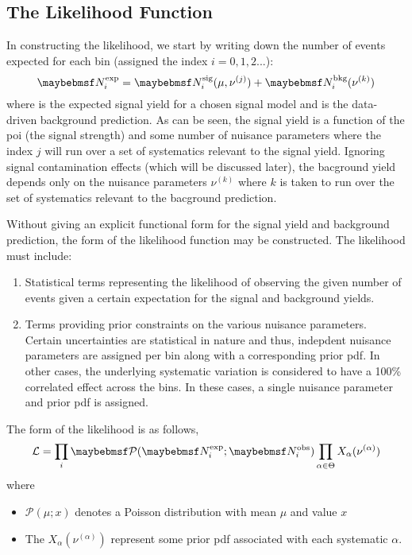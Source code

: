 \subsection{The Likelihood Function}
In constructing the likelihood, we start by writing down the number of events
expected for each bin (assigned the index $i=0,1,2...$):
\begin{equation}
\NExpi = \NSigi(\mu, \nu^{(j)}) +
\NBkgi(\nu^{(k)}) \\
\end{equation}
where \NSigi is the expected signal yield for a chosen
signal model and \NBkgi is the data-driven background
prediction. As can be seen, the signal yield is a function of the \ac{poi} (the
signal strength) and some number of nuisance parameters where the index $j$
will run over a set of systematics relevant to the signal yield. Ignoring
signal contamination effects (which will be discussed later), the bacground
yield depends only on the nuisance parameters $\nu^{(k)}$ where $k$ is taken to run
over the set of systematics relevant to the bacground prediction.

Without giving an explicit functional form for the signal yield and background
prediction, the form of the likelihood function may be constructed. The
likelihood must include:
\begin{enumerate}
\item Statistical terms representing the likelihood of observing the given
  number of events given a certain expectation for the signal and background
  yields.
\item Terms providing prior constraints on the various nuisance
  parameters. Certain uncertainties are statistical in nature and thus,
  indepdent nuisance parameters are assigned per bin along with a corresponding
  prior pdf. In other cases, the underlying systematic variation is considered
  to have a 100\% correlated effect across the bins. In these cases, a single
  nuisance parameter and prior pdf is assigned.
\end{enumerate}

The form of the likelihood is as follows,
\begin{equation}
\mathcal{L} = \prod_i \Poisson(\NExpi ; \NObsi)
\prod_{\alpha \in \Theta}  X_\alpha(\nu^{(\alpha)})
\end{equation}
where
\begin{itemize}
\item $\mathcal{P}(\mu;x)$ denotes a Poisson distribution with mean $\mu$ and value
$x$
\item The $X_\alpha(\nu^{(\alpha)})$ represent some prior pdf associated with
  each systematic $\alpha$.
\end{itemize}

